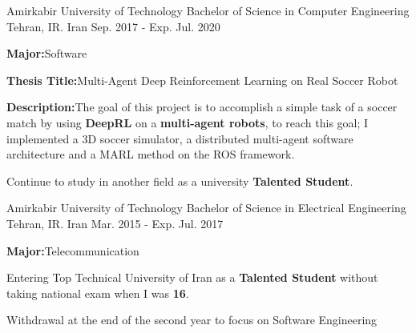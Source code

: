 

\begin{cventries}

  \cventry
    {Amirkabir University of Technology} %
    {Bachelor of Science in Computer Engineering} %
    {Tehran, IR. Iran} %
    {Sep. 2017 - Exp. Jul. 2020} %
    {
      \begin{cvitems} %
        \item {\textbf{Major:}\enskip\enskip\enskip Software}
        \item {\textbf{Thesis Title:}\enskip\enskip\enskip Multi-Agent Deep Reinforcement Learning on Real Soccer Robot}
        \item {\textbf{Description:}\enskip\enskip\enskip The goal of this project is to accomplish a simple task of a soccer match by using \textbf{DeepRL} on a \textbf{multi-agent robots}, to reach this goal; I implemented a 3D soccer simulator, a distributed multi-agent software architecture and a MARL method on the ROS framework.}
        \item {Continue to study in another field as a university \textbf{Talented Student}.}
      \end{cvitems}
    }

  \cventry
    {Amirkabir University of Technology} %
    {Bachelor of Science in Electrical Engineering} %
    {Tehran, IR. Iran} %
    {Mar. 2015 - Exp. Jul. 2017} %
    {
      \begin{cvitems} %
      \item {\textbf{Major:}\enskip\enskip\enskip Telecommunication}
        \item {Entering Top Technical University of Iran as a \textbf{Talented Student} without taking national exam  when I was \textbf{16}.}
        \item {Withdrawal at the end of the second year to focus on Software Engineering}
      \end{cvitems}
    }

\end{cventries}
